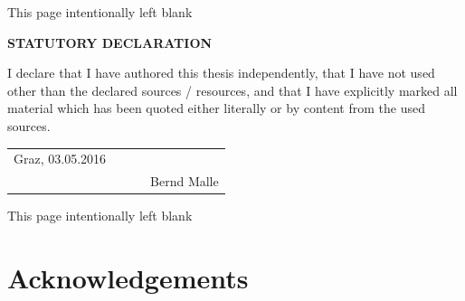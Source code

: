 {
%
%
%
\clearpage
\begin{center}
This page intentionally left blank
\end{center}
\clearpage



\pagestyle{plain}
\setcounter{page}{3}


\begin{center}
\textbf{STATUTORY DECLARATION}
\end{center}

\noindent
I declare that I have authored this thesis independently, that I have
not used other than the declared sources / resources, and that I have
explicitly marked all material which has been quoted either literally
or by content from the used sources.

\vspace{1cm}
\begin{flushleft}
\begin{tabular}{lclc}
Graz, 03.05.2016 & {\hspace*{3cm}} & ~\hfill &  \underline{\hspace*{5cm}} \\
~\hfill & {\hspace*{3cm}} & ~\hfill & Bernd Malle   \\
\end{tabular}
\end{flushleft}
\vspace{2cm}
\clearpage

\clearpage
\begin{center}
This page intentionally left blank
\end{center}
\clearpage

\section*{Acknowledgements}

}
